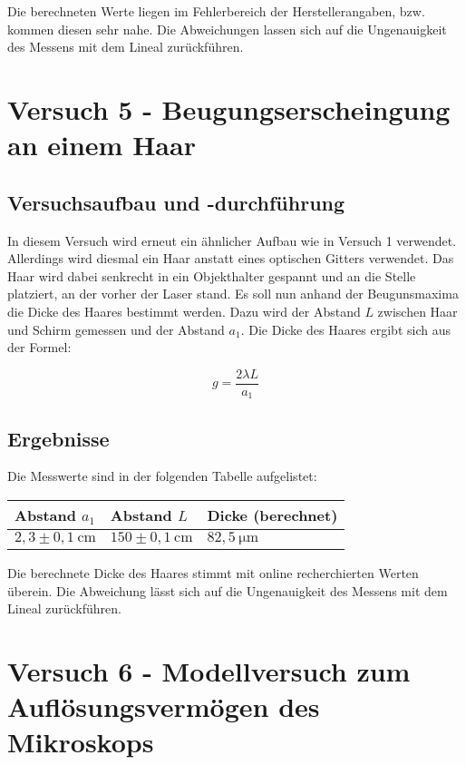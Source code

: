         Die berechneten Werte liegen im Fehlerbereich der Herstellerangaben, bzw. kommen diesen sehr nahe. Die Abweichungen lassen sich auf die Ungenauigkeit des Messens mit dem Lineal zurückführen.

\section{Versuch 5 - Beugungserscheingung an einem Haar}
    
    \subsection{Versuchsaufbau und -durchführung}
        
        In diesem Versuch wird erneut ein ähnlicher Aufbau wie in Versuch 1 verwendet. Allerdings wird diesmal ein Haar anstatt eines optischen Gitters verwendet. Das Haar wird dabei senkrecht in ein Objekthalter gespannt und an die Stelle platziert, an der vorher der Laser stand.
        Es soll nun anhand der Beugunsmaxima die Dicke des Haares bestimmt werden. Dazu wird der Abstand $L$ zwischen Haar und Schirm gemessen und der Abstand $a_{1}$. Die Dicke des Haares ergibt sich aus der Formel:

        $$g = \frac{2 \lambda L}{a_{1}}$$
    
    \subsection{Ergebnisse}

        Die Messwerte sind in der folgenden Tabelle aufgelistet:

        \begin{table}[H]
            \centering
            \begin{tabular}{|l|l|l|}
                \hline
                Abstand $a_{1}$ & Abstand $L$ & Dicke (berechnet)\\
                \hline
                $2,3 \pm 0,1\ \mathrm{cm}$ & $150 \pm 0,1\ \mathrm{cm}$ & $82,5\ \mathrm{\mu m}$\\
                \hline
            \end{tabular}
        \end{table}

        Die berechnete Dicke des Haares stimmt mit online recherchierten Werten überein. Die Abweichung lässt sich auf die Ungenauigkeit des Messens mit dem Lineal zurückführen.

\section{Versuch 6 - Modellversuch zum Auflösungsvermögen des Mikroskops}

